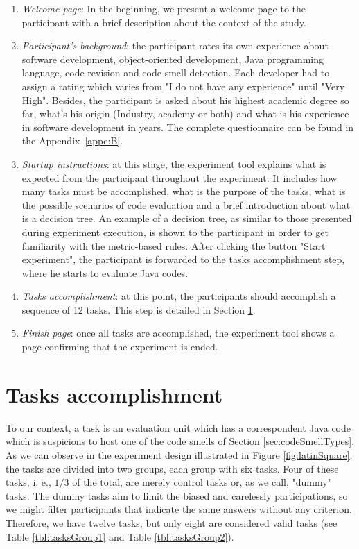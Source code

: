 \begin{enumerate}
    \item \textit{Welcome page}: In the beginning, we present a welcome page to the participant with a brief description about the context of the study.
    
    \item \textit{Participant's background}: the participant rates its own experience about software development, object-oriented development, Java programming language, code revision and code smell detection. Each developer had to assign a rating which varies from "I do not have any experience" until "Very High".  Besides, the participant is asked about his highest academic degree so far, what's his origin (Industry, academy or both) and what is his experience in software development in years. The complete questionnaire can be found in the Appendix~\ref{appe:B}.
    
    \item \textit{Startup instructions}: at this stage, the experiment tool explains what is expected from the participant throughout the experiment. It includes how many tasks must be accomplished, what is the purpose of the tasks, what is the possible scenarios of code evaluation and a brief introduction about what is a decision tree. An example of a decision tree, as similar to those presented during experiment execution,  is shown to the participant in order to get familiarity with the metric-based rules. After clicking the button "Start experiment", the participant is forwarded to the tasks accomplishment step, where he starts to evaluate Java codes.  
    
    \item \textit{Tasks accomplishment}: at this point, the participants should accomplish a sequence of 12 tasks. This step is detailed in Section \ref{sec:tasksAccomplishment}.  
    
    \item \textit{Finish page}: once all tasks are accomplished, the experiment tool shows a page confirming that the experiment is ended.
    
\end{enumerate}

\section{Tasks accomplishment} \label{sec:tasksAccomplishment}

To our context, a task is an evaluation unit which has a correspondent Java code which is suspicions to host one of the code smells of Section \ref{sec:codeSmellTypes}. As we can observe in the experiment design illustrated in Figure \ref{fig:latinSquare}, the tasks are divided into two groups, each group with six tasks. Four of these tasks, i. e., $1/3$ of the total, are merely control tasks or, as we call, "dummy" tasks. The dummy tasks aim to limit the biased \cite{palomba2014they} and carelessly participations, so we might filter participants that indicate the same answers without any criterion. Therefore, we have twelve tasks, but only eight are considered valid tasks (see Table \ref{tbl:tasksGroup1} and Table \ref{tbl:tasksGroup2}).

